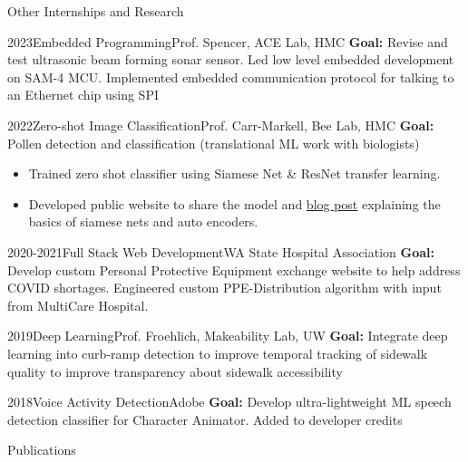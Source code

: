 \documentclass[]{mcdowellcv}
\begin{document}
\begin{cvsection}{Other Internships and Research}
	\begin{cvsubsection}{2023}{Embedded Programming}{Prof. Spencer, ACE Lab, HMC}
		\textbf{Goal:}  Revise and test ultrasonic beam forming sonar sensor. Led low level embedded development on SAM-4 MCU. Implemented embedded
		communication protocol for talking to an Ethernet chip using SPI
	\end{cvsubsection}
	\begin{cvsubsection}{2022}{Zero-shot Image Classification}{Prof. Carr-Markell, Bee Lab, HMC}
		\textbf{Goal:} Pollen detection and classification (translational ML work with biologists)
		\begin{itemize}
			\item Trained zero shot  classifier using Siamese Net \& ResNet transfer learning.
			\item Developed public website to share the model and \href{https://hmcbee.blogspot.com/2022/12/blue-bees-twin-neural-networks-and-more.html}{blog post} explaining the basics of siamese nets and auto encoders.
		\end{itemize}
	\end{cvsubsection}
	\begin{cvsubsection}{2020-2021}{Full Stack Web Development}{WA State Hospital Association}
		\textbf{Goal:} Develop custom Personal Protective Equipment exchange website to help address COVID shortages. Engineered custom PPE-Distribution algorithm with input from  MultiCare Hospital.
	\end{cvsubsection}
	\begin{cvsubsection}{2019}{Deep Learning}{Prof. Froehlich, Makeability Lab, UW}
		\textbf{Goal:} Integrate deep learning into curb-ramp detection to improve temporal tracking of sidewalk quality to improve transparency about sidewalk accessibility
	\end{cvsubsection}

	\begin{cvsubsection}{2018}{Voice Activity Detection}{Adobe}
		\textbf{Goal:} Develop ultra-lightweight ML speech detection classifier for Character Animator. Added to developer credits
	\end{cvsubsection}
\end{cvsection}

\begin{cvsection}{Publications}



\end{cvsection}
\end{document}
